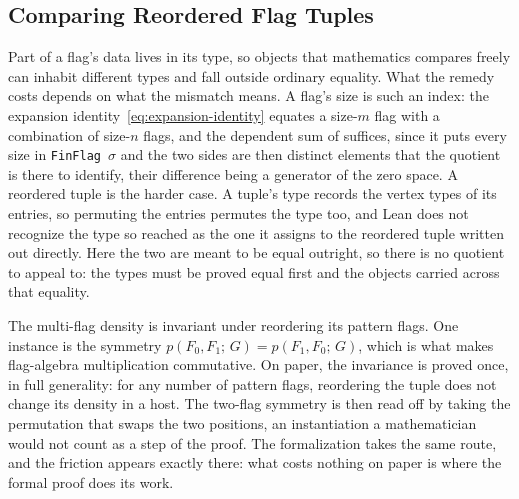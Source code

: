 \documentclass[acmsmall,screen=true,acmthm=false]{acmart}
\newcommand{\den}[2]{p(#1;\,#2)}
\DeclareRobustCommand{\lean}[1]{{\def\_{\textunderscore\allowbreak}\texttt{#1}}}
\begin{document}
\subsection{Comparing Reordered Flag Tuples}
\label{sec:reordered-flag-tuples}

Part of a flag's data lives in its type, so objects that mathematics compares
freely can inhabit different types and fall outside ordinary equality.  What
the remedy costs depends on what the mismatch means.  A flag's size is such an
index: the expansion identity~\eqref{eq:expansion-identity} equates a size-$m$
flag with a combination of size-$n$ flags, and the dependent sum of
 suffices, since it puts every size in
\lean{FinFlag}~$\sigma$ and the two sides are then distinct elements that the
quotient is there to identify, their difference being a generator of the zero
space.  A reordered tuple is the harder case.  A tuple's type records the
vertex types of its entries, so permuting the entries permutes the type too,
and Lean does not recognize the type so reached as the one it assigns to the
reordered tuple written out directly.  Here the two are meant to be equal
outright, so there is no quotient to appeal to: the types must be proved
equal first and the objects carried across that equality.

The multi-flag density is invariant under reordering its pattern flags.  One
instance is the symmetry
\(
  \den{F_0,F_1}{G}=\den{F_1,F_0}{G}
\),
which is what makes flag-algebra multiplication commutative.  On paper, the
invariance is proved once, in full generality: for any number of pattern
flags, reordering the tuple does not change its density in a host.  The
two-flag symmetry is then read off by taking the permutation that swaps the
two positions, an instantiation a mathematician would not count as a step of
the proof.  The formalization takes the same route, and the friction appears
exactly there: what costs nothing on paper is where the formal proof does its
work.
\end{document}
